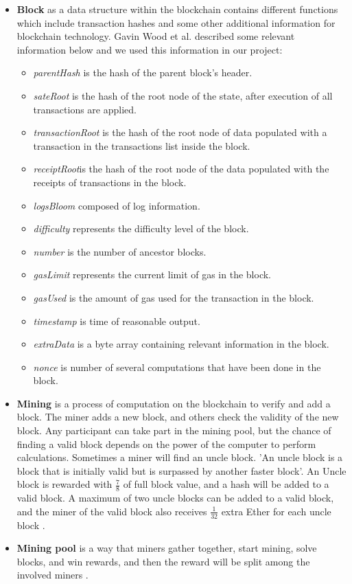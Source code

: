 \begin{itemize}
    \item \textbf{Block} as a data structure within the blockchain contains different functions which include transaction hashes and some other additional information for blockchain technology. Gavin Wood et al. \cite{Gavin} described some relevant information below and we used this information in our project: \\
    \begin{itemize}
        \item \textit{parentHash} is the hash of the parent block’s header.
        \item \textit{sateRoot} is the hash of the root node of the state, after execution of all transactions are applied.
        \item \textit{transactionRoot} is the hash of the root node of data populated with a transaction in the transactions list inside the block.
        \item \textit{receiptRoot}is the hash of the root node of the data populated with the receipts of transactions in the block.
        \item \textit{logsBloom} composed of log information.
        \item \textit{difficulty} represents the difficulty level of the block.
        \item \textit{number} is the number of ancestor blocks.
        \item \textit{gasLimit} represents the current limit of gas in the block.
        \item \textit{gasUsed} is the amount of gas used for the transaction in the block.
        \item \textit{timestamp} is time of reasonable output.
        \item \textit{extraData} is a byte array containing relevant information in the block.
        \item \textit{nonce} is number of several computations that have been done in the block.
    \end{itemize}
  \item \textbf{Mining} is a process of computation on the blockchain to verify and add a block. The miner adds a new block, and others check the validity of the new block. Any participant can take part in the mining pool, but the chance of finding a valid block depends on the power of the computer to perform calculations. Sometimes a miner will find an uncle block. 'An uncle block is a block that is initially valid but is surpassed by another faster block'. An Uncle block is rewarded with $\frac{7}{8}$ of full block value, and a hash will be added to a valid block. A maximum of two uncle blocks can be added to a valid block, and the miner of the valid block also receives $\frac{1}{32}$ extra Ether for each uncle block \cite{Egbertsen}.
    \item \textbf{Mining pool} is a way that miners gather together, start mining, solve blocks, and win rewards, and then the reward will be split among the involved miners \cite{Egbertsen}.
\end{itemize}
